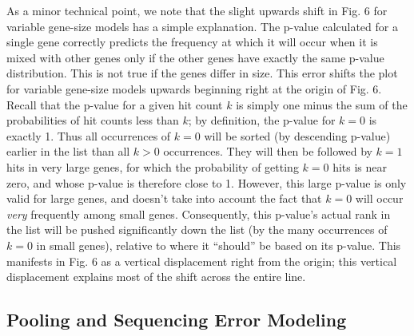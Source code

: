 \documentclass[letterpaper,10pt,english]{howto}
\begin{document}
As a minor technical point, we note that the slight upwards
shift in Fig. 6 for variable gene-size models has a simple
explanation.  The p-value calculated for a single gene
correctly predicts the frequency at which it will occur
when it is mixed with other genes only if the other
genes have exactly the same p-value distribution.  This
is not true if the genes differ in size.  This error shifts
the plot for variable gene-size models upwards beginning right
at the origin of Fig. 6.  Recall that the p-value for a given
hit count $k$ is simply one minus the sum of the
probabilities of hit counts less than $k$;
by definition, the p-value for
$k=0$ is exactly 1.  Thus all occurrences of $k=0$
will be sorted (by descending p-value) earlier in the list than
all $k>0$ occurrences.  They will then
be followed by $k=1$ hits in very large genes, for which
the probability of getting $k=0$ hits is near zero,
and whose p-value is therefore close to 1.
However, this large p-value is only valid for large
genes, and doesn't take into account the fact that
$k=0$ will occur \emph{very} frequently among small genes.
Consequently, this p-value's
actual rank in the list will be pushed significantly
down the list (by the many occurrences of $k=0$ in small genes),
relative to where it ``should'' be based on its p-value.
This manifests in Fig. 6 as a vertical displacement
right from the origin; this vertical displacement explains
most of the shift across the entire line.


\subsection{Pooling and Sequencing Error Modeling}
\end{document}

